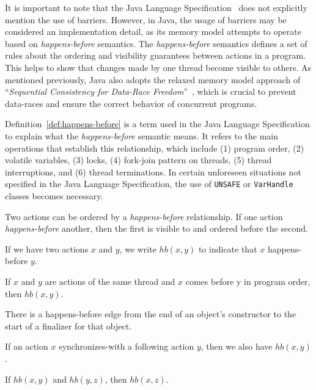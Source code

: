 It is important to note that the Java Language Specification~\cite{javamemorymodelspec} does not explicitly mention the use of barriers. However, in Java, the usage of barriers may be considered an implementation detail, as its memory model attempts to operate based on \textit{happens-before} semantics. The \textit{happens-before} semantics defines a set of rules about the ordering and visibility guarantees between actions in a program. This helps to show that changes made by one thread become visible to others. As mentioned previously, Java also adopts the relaxed memory model approach of ``\textit{Sequential Consistency for Data-Race Freedom}''~\cite{DBLP_conf_isca_AdveH90}, which is crucial to prevent data-races and ensure the correct behavior of concurrent programs.

Definition~\ref{def:happens-before} is a term used in the Java Language Specification to explain what the \textit{happens-before} semantic means. It refers to the main operations that establish this relationship, which include (1) program order, (2) volatile variables, (3) locks, (4) fork-join pattern on threads, (5) thread interruptions, and (6) thread terminations. In certain unforeseen situations not specified in the Java Language Specification, the use of \texttt{UNSAFE} or \texttt{VarHandle} classes becomes necessary.

\begin{definition}

Two actions can be ordered by a \textit{happens-before} relationship. If one action \textit{happens-before} another, then the first is visible to and ordered before the second.

If we have two actions \(x\) and \(y\), we write \(hb(x, y)\) to indicate that \(x\) happens-before \(y\).

If \(x\) and \(y\) are actions of the same thread and \(x\) comes before y in program order, then \(hb(x, y)\).

There is a happens-before edge from the end of an object's constructor to the start of a finalizer for that object.

If an action \(x\) synchronizes-with a following action \(y\), then we also have \(hb(x, y)\).

If \(hb(x, y)\) and \(hb(y, z)\), then \( hb(x, z)\).
\end{definition}


